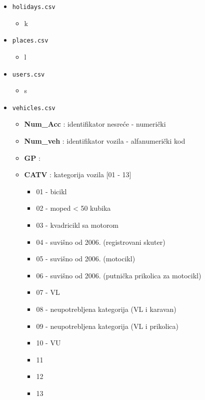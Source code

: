 \documentclass[a4paper,10pt]{article}
\begin{document}
\begin{itemize}
\begin{itemize}
 \end{itemize}

 \item \texttt{holidays.csv}
 \begin{itemize}
  \item k
 \end{itemize}
 
 \item \texttt{places.csv}
 \begin{itemize}
  \item l
 \end{itemize}
 
 \item \texttt{users.csv}
 \begin{itemize}
  \item s
 \end{itemize}
 
 \item \texttt{vehicles.csv}
 \begin{itemize}
  \item \textbf{Num\_Acc} : identifikator nesreće - numerički
  \item \textbf{Num\_veh} : identifikator vozila - alfanumerički kod
  \item \textbf{GP} : %
  \item \textbf{CATV} : kategorija vozila [01 - 13]
		      \begin{itemize}
		       \item 01 - bicikl
		       \item 02 - moped < 50 kubika
		       \item 03 - kvadricikl sa motorom
		       \item 04 - suvišno od 2006. (registrovani skuter)
		       \item 05 - suvišno od 2006. (motocikl)
		       \item 06 - suvišno od 2006. (putnička prikolica za motocikl)
		       \item 07 - VL %
		       \item 08 - neupotrebljena kategorija (VL i karavan)
		       \item 09 - neupotrebljena kategorija (VL i prikolica)
		       \item 10 - VU %
		       \item 11 
		       \item 12 
		       \item 13 
		      \end{itemize}

 \end{itemize}
 
\end{itemize}
\end{document}
